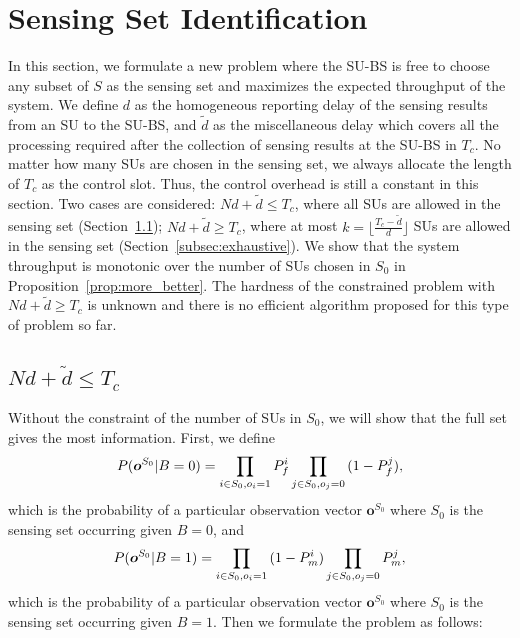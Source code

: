 \documentclass[conference]{IEEEtran}
\begin{document}
\section{Sensing Set Identification}
\label{sec:uncertain_set}
In this section, we formulate a new problem where the SU-BS is free to choose any subset of $S$ as the sensing set and maximizes the expected throughput of the system. We define $d$ as the homogeneous reporting delay of the sensing results from an SU to the SU-BS, and $\tilde{d}$ as the miscellaneous delay which covers all the processing required after the collection of sensing results at the SU-BS in $T_c$. No matter how many SUs are chosen in the sensing set, we always allocate the length of $T_c$ as the control slot. Thus, the control overhead is still a constant in this section. Two cases are considered: $Nd+\tilde{d}\le T_c$, where all SUs are allowed in the sensing set (Section~\ref{subsec:const}); $Nd+\tilde{d}\ge T_c$, where at most $k=\lfloor \frac{T_c-\tilde{d}}{d} \rfloor$ SUs are allowed in the sensing set (Section~\ref{subsec:exhaustive}). We show that the system throughput is monotonic over the number of SUs chosen in $S_0$ in Proposition~\ref{prop:more_better}. The hardness of the constrained problem with $Nd+\tilde{d}\ge T_c$ is unknown and there is no efficient algorithm proposed for this type of problem so far. 

\subsection{$Nd+\tilde{d}\le T_c$}
\label{subsec:const}

Without the constraint of the number of SUs in $S_0$, we will show that the full set gives the most information. First, we define 
\vspace{-0.5em}
\begin{equation}
P(\boldsymbol{o}^{S_0}|B=0)=\prod\limits_{i\in S_0,o_i=1}{P_f^i}\prod\limits_{j\in S_0,o_j=0}{(1-P_f^j)},\vspace{-0.5em}
\end{equation}
which is the probability of a particular observation vector $\boldsymbol{o}^{S_0}$ where $S_0$ is the sensing set occurring given $B=0$, and 
\vspace{-0.2em}
\begin{equation}
P(\boldsymbol{o}^{S_0}|B=1)=\prod\limits_{i\in S_0,o_i=1}{(1-P_m^i)}\prod\limits_{j\in S_0,o_j=0}{P_m^j},\vspace{-0.5em}
\end{equation} 
which is the probability of a particular observation vector $\boldsymbol{o}^{S_0}$ where $S_0$ is the sensing set occurring given $B=1$. Then we formulate the problem as follows:
\end{document}
